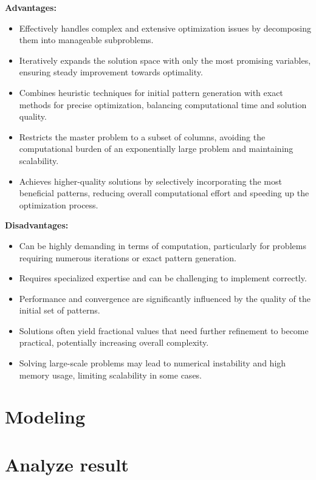 \documentclass[a4paper]{article}
\begin{document}
\vspace{0.25cm}
\noindent\textbf{Advantages:} 
\begin{itemize}
    \item Effectively handles complex and extensive optimization issues by decomposing them into manageable subproblems.
    \item Iteratively expands the solution space with only the most promising variables, ensuring steady improvement towards optimality.
    \item Combines heuristic techniques for initial pattern generation with exact methods for precise optimization, balancing computational time and solution quality.
    \item Restricts the master problem to a subset of columns, avoiding the computational burden of an exponentially large problem and maintaining scalability.
    \item Achieves higher-quality solutions by selectively incorporating the most beneficial patterns, reducing overall computational effort and speeding up the optimization process.
\end{itemize}

\vspace{0.35cm}

\noindent\textbf{Disadvantages:}
\begin{itemize}
    \item Can be highly demanding in terms of computation, particularly for problems requiring numerous iterations or exact pattern generation.
    \item Requires specialized expertise and can be challenging to implement correctly.
    \item Performance and convergence are significantly influenced by the quality of the initial set of patterns.
    \item Solutions often yield fractional values that need further refinement to become practical, potentially increasing overall complexity.
    \item Solving large-scale problems may lead to numerical instability and high memory usage, limiting scalability in some cases.
\end{itemize}



\section{Modeling}
\section{Analyze result}
\end{document}
